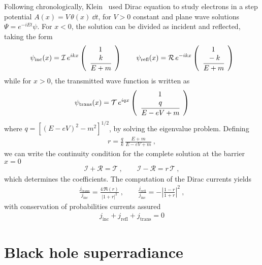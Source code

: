Following chronologically, Klein~\cite{Klein1929} used Dirac equation to study electrons in a step potential $A(x) = V\,\theta(x) ~\dd t$, for $V>0$ constant and plane wave solutions $\Psi= e^{-i E t} \psi$. For $x<0$, the solution can be divided as incident and reflected, taking the form
\begin{align}
    \psi_\mathrm{inc}(x) = \mathcal{I}\, e^{i k x} \left(\begin{array}{c} 1 \\ \cfrac{k}{E+m} \end{array}\right) \qquad
    \psi_\mathrm{refl}(x) = \mathcal{R}\, e^{- i k x} \left(\begin{array}{c} 1 \\ \cfrac{-k}{E+m} \end{array}\right)
\end{align}
while for $x>0$, the transmitted wave function is written as 
\begin{align}
    \psi_\mathrm{trans}(x) = \mathcal{T}\, e^{i q x} \left(\begin{array}{c} 1 \\ \cfrac{q}{ E - e V + m} \end{array}\right)
\end{align}
where $q = [(E-e V)^2 - m^2]^{1/2}$, by solving the eigenvalue problem. Defining
\begin{align}
    r = \frac{q}{k}\,\frac{E+m}{E-e V+m} ~,
\end{align}
we can write the continuity condition for the complete solution at the barrier $x=0$
\begin{align}
    \mathcal{I} + \mathcal{R} = \mathcal{T} ~,\qquad \mathcal{I} - \mathcal{R} = r\, \mathcal{T} ~,
\end{align}
which determines the coefficients. The computation of the Dirac currents yields
\begin{align}
    \frac{j_\mathrm{trans}}{j_\mathrm{inc}} = \frac{4 \,\Re(r)}{|1+r|^2}  ~,\qquad \frac{j_\mathrm{refl}}{j_\mathrm{inc}} = - \left|\frac{1-r}{1+r}\right|^2 ~, 
\end{align}
with conservation of probabilities currents assured
\begin{align}
    j_\mathrm{inc} + j_\mathrm{refl} + j_\mathrm{trans} = 0 
\end{align}


\section{Black hole superradiance}




\cleardoublepage
